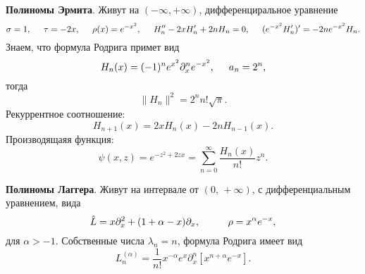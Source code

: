 \textbf{Полиномы Эрмита}. Живут на $(-\infty, +\infty)$, дифференциральное уравнение
\begin{equation*}
    \sigma = 1, \hspace{5 mm} 
    \tau = - 2 x,
    \hspace{5 mm} \rho(x)  = e^{-x^2},
    \hspace{5 mm} 
    H_n'' - 2 x H_n' + 2 n H_n = 0, 
    \hspace{5 mm} 
    (e^{-x^2} H_n')' = -2 n e^{-x^2} H_n.
\end{equation*}
Знаем, что формула Родрига примет вид
\begin{equation*}
    H_n (x) = (-1)^n e^{x^2} \partial_x^n e^{-x^2},
    \hspace{5 mm} 
    a_n = 2^n,
\end{equation*}
тогда
\begin{equation*}
    \|H_n\|^2 =  2^n n! \sqrt{\pi}.
\end{equation*}
Рекуррентное соотношение:
\begin{equation*}
    H_{n+1} (x) = 2 x H_n (x) - 2 n H_{n-1} (x).
\end{equation*}
Производящаяя функция:
\begin{equation*}
    \psi(x,z) = e^{-z^2+2 zx} = \sum_{n=0}^{\infty}  \frac{H_n (x)}{n!} z^n.
\end{equation*}


\textbf{Полиномы Лаггера}. Живут на интервале от $(0,\, +\infty)$, с дифференциальным уравнением, вида
\begin{equation*}
    \hat{L} =  x \partial_x^2 + (1 +\alpha - x) \partial_x,
    \hspace{10 mm} 
    \rho = x^{\alpha} e^{-x},
\end{equation*}
для $\alpha > -1$. Собственные числа $\lambda_n = n$, формула Родрига имеет вид
\begin{equation*}
    L_n^{(\alpha)} = \frac{1}{n!} x^{-\alpha} e^x \partial_x^n \left[x^{n+\alpha} e^{-x}\right].
\end{equation*}
